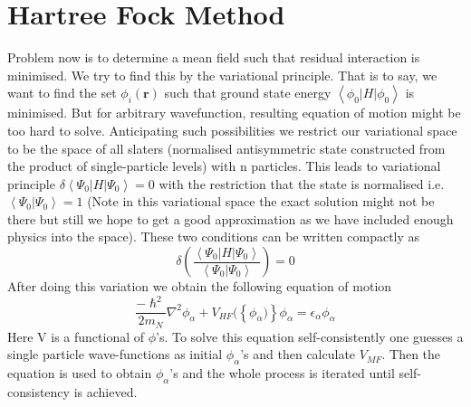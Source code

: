 \documentclass[a4paper]{paper}
\begin{document}
        \section{Hartree Fock Method}
            Problem now is to determine a mean field such that residual interaction is minimised. We try to find this by the variational principle. That is to say, we want to find the set ${\phi_i(\mathbf{r})}$ such that ground state energy $\left\langle\phi_0|H|\phi_0\right\rangle$ is minimised. But for arbitrary wavefunction, resulting equation of motion might be too hard to solve. Anticipating such possibilities we restrict our variational space to be the space of all slaters (normalised antisymmetric state constructed from the product of single-particle levels) with n particles. This leads to variational principle $\delta\left\langle\Psi_0|H|\Psi_0\right\rangle = 0$ with the restriction that the state is normalised i.e. $\left\langle\Psi_0|\Psi_0\right\rangle = 1$ (Note in this variational space the exact solution might not be there but still we hope to get a good approximation as we have included enough physics into the space).  These two conditions can be written compactly as
            \begin{equation}
                \delta\left(\dfrac{\left\langle\Psi_0|H|\Psi_0\right\rangle}{\left\langle\Psi_0|\Psi_0\right\rangle}\right) = 0
            \end{equation}
            After doing this variation we obtain the following equation of motion
            \begin{equation}
                \dfrac{-\hslash^2}{2m_N}\nabla^2 \phi_\alpha + V_{HF}(\left\{\phi_{\alpha})\right\}\phi_{\alpha} = \epsilon_{\alpha}\phi_{\alpha}
            \end{equation}
            Here V is a functional of $\phi$'s. To solve this equation self-consistently one guesses a single particle wave-functions as initial $\phi_{\alpha}$'s and then calculate $V_{MF}$. Then the equation is used to obtain $\phi_{\alpha}$'s and the whole process is iterated until self-consistency is achieved.
\end{document}
